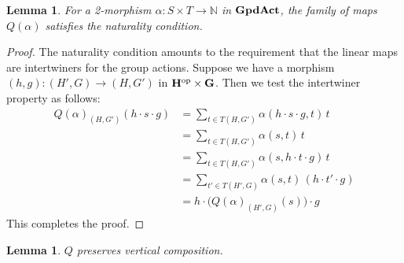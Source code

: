 \documentclass[a4paper,12pt]{article}
\newtheorem{lemma}[theorem]{Lemma}
\theoremstyle{definition}
\newcommand\cat[1]{{\ensuremath{\bf #1}}}
\newcommand\N{\ensuremath{\mathbb{N}}}
\renewcommand{\-}[0]{\nobreakdash-\hspace{0pt}}
\newcommand\op{\ensuremath{\mathrm{op}}}
\newcommand\GA{\cat{GpdAct}{}}
\begin{document}
\begin{lemma}
For a 2\-morphism $\alpha: S \times T \to \N$ in \GA, the family of maps $Q(\alpha)$ satisfies the naturality condition.
\end{lemma}
\begin{proof}
The naturality condition amounts to the requirement that the linear maps are intertwiners for the group actions. Suppose we have a morphism $(h,g):(H',G) \to (H,G')$ in $\cat H ^\op \times \cat G$. Then we test the intertwiner property as follows:
\begin{align*}
Q(\alpha)_{(H,G')}(h \cdot s \cdot g)
&= \textstyle \sum_{t \in T(H,G')} \alpha(h \cdot s \cdot g, t) \, t
\\
&= \textstyle \sum_{t \in T(H,G')} \alpha(s,t)\, t
\\
&= \textstyle \sum_{t \in T(H,G')} \alpha(s,h \cdot t \cdot g)\, t
\\
&= \textstyle \sum _{t' \in T (H',G)} \alpha(s,t) \, (h \cdot t' \cdot g)
\\
&= h \cdot \big(Q(\alpha) _{(H',G)}(s) \big) \cdot g
\end{align*}
This completes the proof.
\end{proof}

\begin{lemma}
 $Q$ preserves vertical composition.
\end{lemma}
\end{document}
